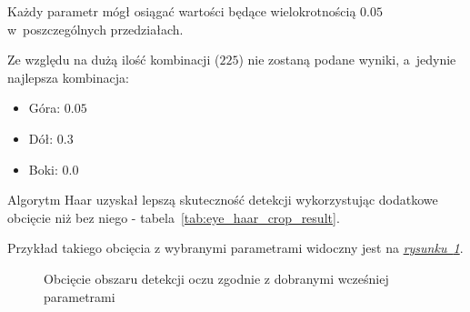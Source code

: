 Każdy parametr mógł osiągać wartości będące wielokrotnością $0.05$ w~poszczególnych przedziałach.

\par

Ze względu na dużą ilość kombinacji ($225$) nie zostaną podane wyniki, a~jedynie najlepsza kombinacja:

\begin{itemize}
    \item Góra: $0.05$
    \item Dół: $0.3$
    \item Boki: $0.0$
\end{itemize}

Algorytm Haar uzyskał lepszą skuteczność detekcji wykorzystując dodatkowe obcięcie niż bez niego - tabela~\ref{tab:eye_haar_crop_result}.



Przykład takiego obcięcia z wybranymi parametrami widoczny jest na \hyperref[{fig:eye_crop}]{\textit{rysunku~\ref{fig:eye_crop}}}.

\begin{figure}[!h]
    \begin{center}
        \hspace{8mm}
    \end{center}
    \caption{Obcięcie obszaru detekcji oczu zgodnie z dobranymi wcześniej parametrami}
    \label{fig:eye_crop}
\end{figure}

